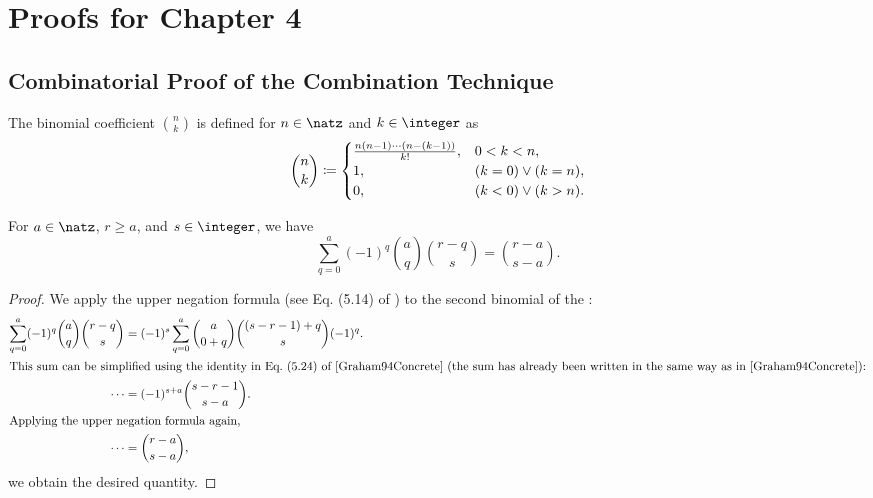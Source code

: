 \section{Proofs for Chapter 4}
\label{sec:a13chapter4}

\disableornamentsfornextheadingtrue
\subsection{Combinatorial Proof of the Combination Technique}
\label{sec:a131proofCombiTechnique}


\begin{definition}
  \label{def:binomialCoefficient}
  The binomial coefficient $\binom{n}{k}$ is defined for
  $n \in \natz$ and $k \in \integer$ as
  \begin{equation}
    \binom{n}{k}
    \coloneqq
    \begin{cases}
      \frac{n (n - 1) \dotsm (n - (k-1))}{k!},&0 < k < n,\\
      1,&(k = 0) \lor (k = n),\\
      0,&(k < 0) \lor (k > n).
    \end{cases}
  \end{equation}
\end{definition}

\begin{lemma}
  \label{lemma:inclusionExclusionCountingLemma}
  For $a \in \natz$, $r \ge a$, and $s \in \integer$, we have
  \begin{equation}
    \sum_{q=0}^a (-1)^q \binom{a}{q} \binom{r-q}{s}
    = \binom{r-a}{s-a}.
  \end{equation}
\end{lemma}

\begin{proof}
  We apply the upper negation formula
  (see Eq. (5.14) of \cite{Graham94Concrete})
  to the second binomial of the \lhs:
  \begin{subequations}
    \begin{align}
      \sum_{q=0}^a (-1)^q \binom{a}{q} \binom{r-q}{s}
      &= (-1)^s \sum_{q=0}^a \binom{a}{0+q} \binom{(s-r-1)+q}{s} (-1)^q.\\
      \intertext{%
        This sum can be simplified using the identity
        in Eq.\ (5.24) of \cite{Graham94Concrete}
        (the sum has already been written in the same way as in
        \cite{Graham94Concrete}):%
      }
      \cdots
      &= (-1)^{s+a} \binom{s-r-1}{s-a}.\\
      \intertext{%
        Applying the upper negation formula again,%
      }
      \cdots
      &= \binom{r-a}{s-a},
    \end{align}
  \end{subequations}
  we obtain the desired quantity.
\end{proof}

